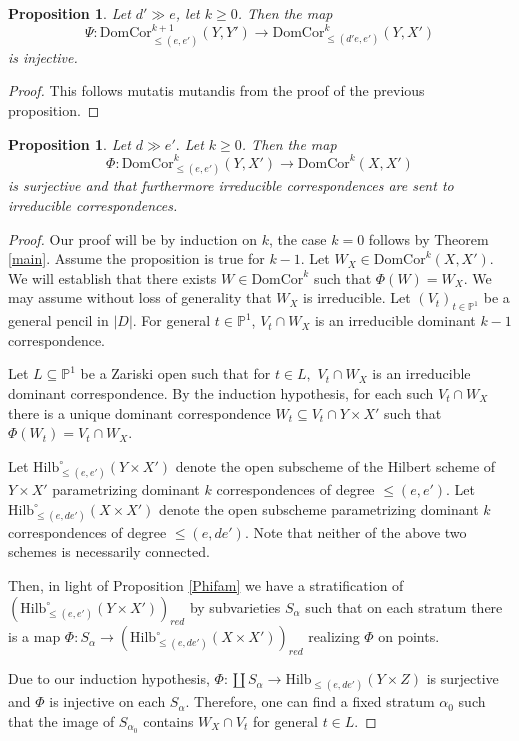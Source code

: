 \documentclass[12pt]{amsart}
\numberwithin{equation}{section}
\newtheorem{proposition}[theorem]{Proposition}
\numberwithin{theorem}{section}
\theoremstyle{definition}
\theoremstyle{definition}
\def\PP{{\mathbb{P}}}
\newcommand{\Hilb}{\mathrm{Hilb}}
\def \DC{{\mathrm{DomCor}}}
\begin{document}
\begin{proposition}
   Let $d' \gg e$, let $ k\ge 0$. Then the map $$\Psi: \DC^{k+1}_{\le(e,e')}(Y, Y') \to \DC^k_{\le (d'e,e')}(Y, X')$$ is injective.
\end{proposition}
\begin{proof}
    This follows mutatis mutandis from the proof of the previous proposition.
\end{proof}
\begin{proposition}
   Let $d \gg e'.$ Let $k \ge 0$. Then the map $$\Phi: \DC^{k}_{\le (e,e')}(Y,X') \to \DC^k(X, X') $$ is surjective and that furthermore irreducible correspondences are sent to irreducible correspondences.
\end{proposition}
\begin{proof}
    Our proof will be by induction on $k$, the case $k=0$ follows by Theorem \ref{main}.
    Assume the proposition is true for $k-1$.
    Let $W_X \in \DC^k(X, X')$. We will establish that there exists $W \in \DC^k$ such that $\Phi(W) = W_X.$ We may assume without loss of generality that $W_X$ is irreducible.
     Let $(V_t)_{t\in \PP^1} $ be a general pencil in $|D|$.  For general $t \in \PP^1$, $V_t \cap W_X $ is an irreducible dominant $k-1$ correspondence. 

      Let $L \subseteq \PP^1$ be a Zariski open such that for $t \in L,$  $V_t \cap W_X $ is an irreducible dominant correspondence. By the induction hypothesis, for each such $V_t \cap W_X$ there is a unique dominant correspondence $W_t \subseteq V_t\cap Y \times X'$ such that $\Phi(W_t) = V_t \cap W_X$.

      Let $\Hilb^{\circ}_{\le (e,e')}(Y \times X')$ denote the open subscheme of the Hilbert scheme of $Y \times X'$ parametrizing dominant $k$ correspondences of degree $\le (e,e')$. Let $\Hilb^{\circ}_{\le (e,de')} (X \times X')$ denote the open subscheme parametrizing dominant $k$ correspondences of degree $\le(e, de')$. Note that neither of the above two schemes is necessarily connected.

      Then, in light of Proposition \ref{Phifam} we have a stratification of $(\Hilb^{\circ}_{\le (e,e')}(Y \times X'))_{red}$ by subvarieties $S_{\alpha}$ such that on each stratum there is a map $\Phi:S_{\alpha} \to (\Hilb^{\circ}_{\le (e,de')} (X \times X') )_{red}$ realizing $\Phi$ on points.

      Due to our induction hypothesis, $\Phi : \coprod S_{\alpha} \to \Hilb_{\le (e,de')} (Y \times Z)$ is surjective and $\Phi$ is injective on each $S_{\alpha}$. Therefore, one can find a fixed stratum $\alpha_0$ such that the image of $S_{\alpha_0}$ contains $W_X \cap V_t $ for general $t \in L$. 
    

\end{proof}
\end{document}
